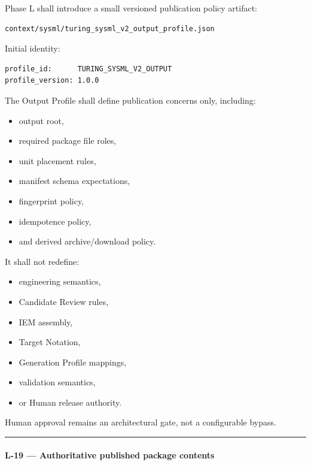 Phase L shall introduce a small versioned publication policy artifact:

\begin{verbatim}
context/sysml/turing_sysml_v2_output_profile.json
\end{verbatim}

Initial identity:

\begin{verbatim}
profile_id:      TURING_SYSML_V2_OUTPUT
profile_version: 1.0.0
\end{verbatim}

The Output Profile shall define publication concerns only, including:

\begin{itemize}
\tightlist
\item
  output root,
\item
  required package file roles,
\item
  unit placement rules,
\item
  manifest schema expectations,
\item
  fingerprint policy,
\item
  idempotence policy,
\item
  and derived archive/download policy.
\end{itemize}

It shall not redefine:

\begin{itemize}
\tightlist
\item
  engineering semantics,
\item
  Candidate Review rules,
\item
  IEM assembly,
\item
  Target Notation,
\item
  Generation Profile mappings,
\item
  validation semantics,
\item
  or Human release authority.
\end{itemize}

Human approval remains an architectural gate, not a configurable bypass.

\begin{center}\rule{0.5\linewidth}{0.5pt}\end{center}

\hypertarget{l-19--authoritative-published-package-contents}{%
\paragraph{L-19 --- Authoritative published package contents}\label{l-19--authoritative-published-package-contents}}

